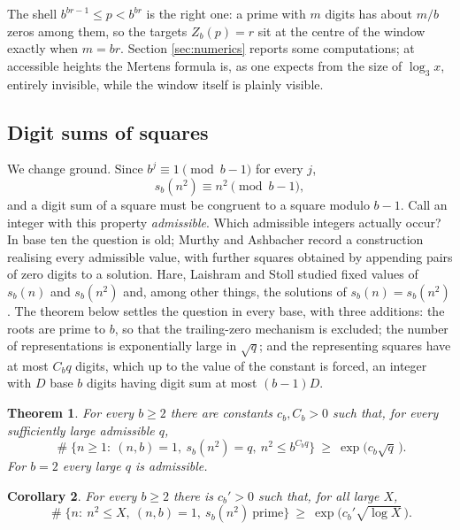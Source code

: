 \documentclass[11pt,reqno]{amsart}
\theoremstyle{plain}
\newtheorem{theorem}{Theorem}[section]
\newtheorem{corollary}[theorem]{Corollary}
\theoremstyle{definition}
\DeclareMathOperator{\Card}{\#}
\begin{document}
The shell $b^{br-1}\le p<b^{br}$ is the right one: a prime with $m$ digits has about $m/b$ zeros among them, so the targets $Z_b(p)=r$ sit at the centre of the window exactly when $m=br$. Section \ref{sec:numerics} reports some computations; at accessible heights the Mertens formula is, as one expects from the size of $\log_3x$, entirely invisible, while the window itself is plainly visible.

\subsection{Digit sums of squares}
We change ground. Since $b^j\equiv1 \pmod{b-1}$ for every $j$,
\[
s_b(n^2)\equiv n^2\pmod{b-1},
\]
and a digit sum of a square must be congruent to a square modulo $b-1$. Call an integer with this property \emph{admissible}. Which admissible integers actually occur? In base ten the question is old; Murthy and Ashbacher \cite[pp.~154--156]{murthyashbacher} record a construction realising every admissible value, with further squares obtained by appending pairs of zero digits to a solution. Hare, Laishram and Stoll \cite{harelaishramstoll} studied fixed values of $s_b(n)$ and $s_b(n^2)$ and, among other things, the solutions of $s_b(n)=s_b(n^2)$. The theorem below settles the question in every base, with three additions: the roots are prime to $b$, so that the trailing-zero mechanism is excluded; the number of representations is exponentially large in $\sqrt q$; and the representing squares have at most $C_bq$ digits, which up to the value of the constant is forced, an integer with $D$ base $b$ digits having digit sum at most $(b-1)D$.

\begin{theorem}\label{thm:squares}
For every $b\ge2$ there are constants $c_b,C_b>0$ such that, for every sufficiently large admissible $q$,
\[
\Card\{n\ge1:\ (n,b)=1,\ s_b(n^2)=q,\ n^2\le b^{C_bq}\}\ \ge\ \exp\big(c_b\sqrt q\,\big).
\]
For $b=2$ every large $q$ is admissible.
\end{theorem}

\begin{corollary}\label{cor:squarescount}
For every $b\ge2$ there is $c_b'>0$ such that, for all large $X$,
\[
\Card\{n:\ n^2\le X,\ (n,b)=1,\ s_b(n^2)\ \text{prime}\}\ \ge\ \exp\big(c_b'\sqrt{\log X}\,\big).
\]
\end{corollary}
\end{document}
